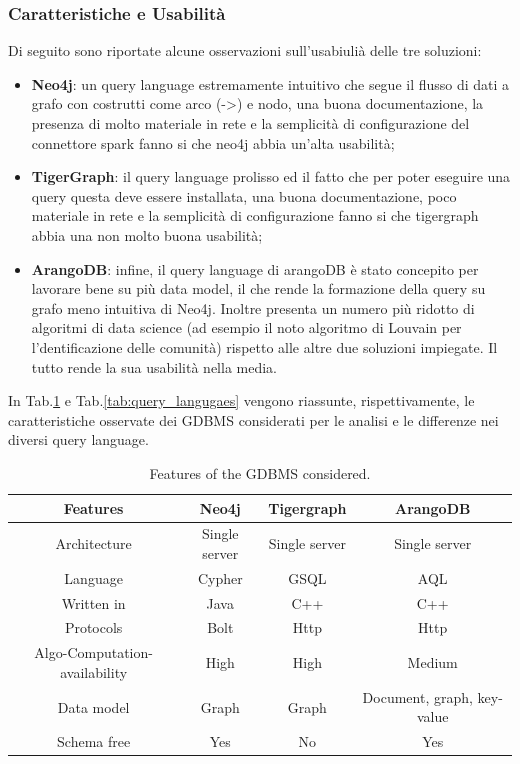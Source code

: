 \documentclass[11pt]{article}
\begin{document}
\subsubsection{Caratteristiche e Usabilità}
Di seguito sono riportate alcune osservazioni sull'usabiulià delle tre soluzioni:
\begin{itemize}
    \item \textbf{Neo4j}: un query language estremamente intuitivo che segue il flusso di dati a grafo con costrutti come arco (->) e nodo, una buona documentazione, la presenza di molto materiale in rete e la semplicità di configurazione del connettore spark fanno si che neo4j abbia un'alta usabilità; 
    \item \textbf{TigerGraph}: il query language prolisso ed il fatto che per poter eseguire una query questa deve essere installata, una buona documentazione, poco materiale in rete e la semplicità di configurazione fanno si che tigergraph abbia una non molto buona usabilità;
    \item \textbf{ArangoDB}: infine, il query language di arangoDB è stato concepito per lavorare bene su più data model, il che rende la formazione della query su grafo meno intuitiva di Neo4j. Inoltre presenta un numero più ridotto di algoritmi di data science (ad esempio il noto algoritmo di Louvain per l'dentificazione delle comunità) rispetto alle altre due soluzioni impiegate. Il tutto rende la sua usabilità nella media.
\end{itemize}
In Tab.\ref{tab:features_GDBMS} e Tab.\ref{tab:query_langugaes} vengono riassunte, rispettivamente, le caratteristiche osservate dei GDBMS considerati per le analisi e le differenze nei diversi query language.
\begin{table}[!ht]
\centering

\begin{tabular}{cccc}
\toprule
Features & Neo4j & Tigergraph & ArangoDB \\
\midrule
    Architecture & Single server & Single server & Single server \\
    Language & Cypher & GSQL & AQL \\
    Written in & Java & C++ & C++ \\
    Protocols & Bolt & Http & Http \\
    Algo-Computation-availability & High & High & Medium \\
    Data model & Graph & Graph & Document, graph, key-value \\
    Schema free & Yes & No & Yes \\
\bottomrule
\end{tabular}
\caption{Features of the GDBMS considered.}
\label{tab:features_GDBMS}
\end{table}
\end{document}
